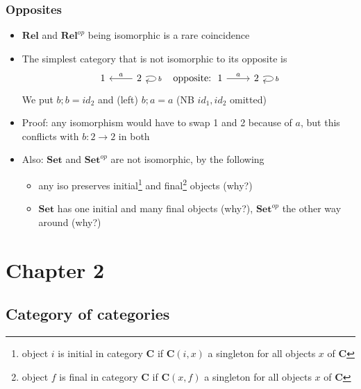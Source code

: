\documentclass[handout]{beamer}
\newcommand{\bfsf}[1]{{\boldsymbol{#1}}}
\newcommand{\Set}{\bfsf{Set}}
\newcommand{\CC}{\bfsf{C}}
\newcommand{\Rel}{\bfsf{Rel}}
\begin{document}
\begin{frame}[fragile]
     
    \frametitle{Opposites}\label{Ch2:Opposites}

 \begin{itemize}[<+->]
\item $\Rel$ and $\Rel^{op}$ being isomorphic is a rare coincidence
\item The simplest category that is not isomorphic to its opposite is
\[
\begin{tikzcd}
1 & 2  \arrow[swap]{l}{a} \arrow[loop right]{l}{b} &\text{opposite:}~~
1 \arrow{r}{a} & 2   \arrow[loop right]{l}{b} 
\end{tikzcd}
\]
We put $b;b = id_2$ and (left) $b;a = a$ (NB $id_1,id_2$ omitted)
\item
Proof: any isomorphism would have to swap 1 and 2 because of $a$,
but this conflicts with $b: 2\to 2$ in both
\item Also: $\Set$ and $\Set^{op}$ are not isomorphic, by the following
   \begin{itemize}[<+->]
\item any iso preserves initial\footnote{%
object $i$ is initial in category $\CC$ if $\CC(i,x)$ a singleton for all objects $x$ of $\CC$} 
and final\footnote{%
object $f$ is final in category $\CC$ if $\CC(x,f)$ a singleton for all objects $x$ of $\CC$}
objects (why?)
\item  $\Set$ has one initial and many final objects (why?),  
$\Set^{op}$ the other way around (why?)
   \end{itemize}

 \end{itemize}
\end{frame}

\section{Chapter 2}
\subsection{Category of categories}
\end{document}
